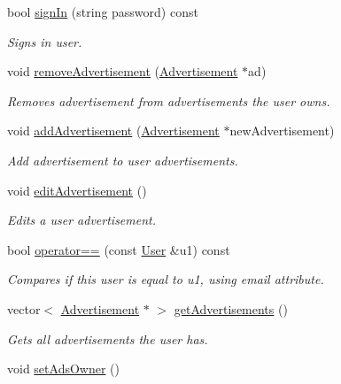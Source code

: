\begin{DoxyCompactItemize}
bool \hyperlink{class_user_af75d18fdc45ac9fba9911815b78b7daa}{sign\+In} (string password) const 
\begin{DoxyCompactList}\small\item\em Signs in user. \end{DoxyCompactList}\item 
void \hyperlink{class_user_a62c158d18b404de5fa049358c2a64a85}{remove\+Advertisement} (\hyperlink{class_advertisement}{Advertisement} $\ast$ad)
\begin{DoxyCompactList}\small\item\em Removes advertisement from advertisements the user owns. \end{DoxyCompactList}\item 
void \hyperlink{class_user_a7ac881e0b18256f2aa5bc58616994965}{add\+Advertisement} (\hyperlink{class_advertisement}{Advertisement} $\ast$new\+Advertisement)
\begin{DoxyCompactList}\small\item\em Add advertisement to user advertisements. \end{DoxyCompactList}\item 
\hypertarget{class_user_a7f9f8c64216df27994ffe53960d2d18a}{}void \hyperlink{class_user_a7f9f8c64216df27994ffe53960d2d18a}{edit\+Advertisement} ()\label{class_user_a7f9f8c64216df27994ffe53960d2d18a}

\begin{DoxyCompactList}\small\item\em Edits a user advertisement. \end{DoxyCompactList}\item 
bool \hyperlink{class_user_aa141a81fd5094fea55f53126a94a0342}{operator==} (const \hyperlink{class_user}{User} \&u1) const 
\begin{DoxyCompactList}\small\item\em Compares if this user is equal to u1, using email attribute. \end{DoxyCompactList}\item 
vector$<$ \hyperlink{class_advertisement}{Advertisement} $\ast$ $>$ \hyperlink{class_user_af0392c9bec07c5dae9f267437189ab3b}{get\+Advertisements} ()
\begin{DoxyCompactList}\small\item\em Gets all advertisements the user has. \end{DoxyCompactList}\item 
\hypertarget{class_user_adcc858fe44180cee73bc834632bfdb25}{}void \hyperlink{class_user_adcc858fe44180cee73bc834632bfdb25}{set\+Ads\+Owner} ()\label{class_user_adcc858fe44180cee73bc834632bfdb25}


\end{DoxyCompactItemize}
